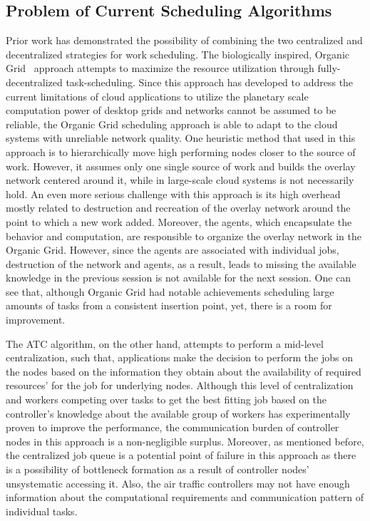 \documentclass{sig-alternate}
\begin{document}
\subsection{Problem of Current Scheduling Algorithms}
Prior work has demonstrated the possibility of combining the two centralized and decentralized strategies for work scheduling. The biologically inspired, Organic Grid~\cite{chakravarti:organic} approach attempts to maximize the resource utilization through fully-decentralized task-scheduling. Since this approach has developed to address the current limitations of cloud applications to utilize the planetary scale computation power of desktop grids and networks cannot be assumed to be reliable, the Organic Grid scheduling approach is able to adapt to the cloud systems with unreliable network quality. One heuristic method that used in this approach is to hierarchically move high performing nodes closer to the source of work. However, it assumes only one single source of work and builds the overlay network centered around it, while in large-scale cloud systems is not necessarily hold. An even more serious challenge with this approach is its high overhead mostly related to destruction and recreation of the overlay network around the point to which a new work added. Moreover, the agents, which encapsulate the behavior and computation, are responsible to organize the overlay network in the Organic Grid. However, since the agents are associated with individual jobs, destruction of the network and agents, as a result, leads to missing the available knowledge in the previous session is not available for the next session. One can see that, although Organic Grid had notable achievements scheduling large amounts of tasks from a consistent insertion point, yet, there is a room for improvement.

The ATC algorithm, on the other hand, attempts to perform a mid-level centralization, such that, applications make the decision to perform the jobs on the nodes based on the information they obtain about the availability of required resources' for the job for underlying nodes. Although this level of centralization and workers competing over tasks to get the best fitting job based on the controller's knowledge about the available group of workers has experimentally proven to improve the performance, the communication burden of controller nodes in this approach is a non-negligible surplus. Moreover, as mentioned before, the centralized job queue is a potential point of failure in this approach as there is a possibility of bottleneck formation as a result of controller nodes' unsystematic accessing it. Also, the air traffic controllers may not have enough information about the computational requirements and communication pattern of individual tasks.
\end{document}
